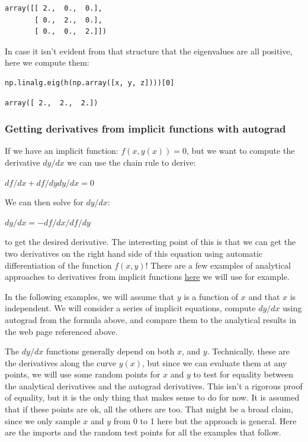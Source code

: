 \documentclass[11pt]{article}
\begin{document}
\begin{verbatim}
array([[ 2.,  0.,  0.],
       [ 0.,  2.,  0.],
       [ 0.,  0.,  2.]])
\end{verbatim}

In case it isn't evident from that structure that the eigenvalues are all positive, here we compute them:

\begin{verbatim}
np.linalg.eig(h(np.array([x, y, z])))[0]
\end{verbatim}

\begin{verbatim}
array([ 2.,  2.,  2.])
\end{verbatim}

\subsubsection{Getting derivatives from implicit functions with autograd}
\label{sec:orgdcfbef1}

If we have an implicit function: \(f(x, y(x)) = 0\), but we want to compute the derivative \(dy/dx\) we can use the chain rule to derive:

\(df/dx + df/dy dy/dx = 0\)

We can then solve for \(dy/dx\):

\(dy/dx = -df/dx / df/dy\)

to get the desired derivative. The interesting point of this is that we can get the two derivatives on the right hand side of this equation using automatic differentiation of the function \(f(x, y)\)! There are a few examples of analytical approaches to derivatives from implicit functions \href{https://www.math.ucdavis.edu/\~kouba/CalcOneDIRECTORY/implicitdiffdirectory/ImplicitDiff.html}{here} we will use for example.

In the following examples, we will assume that \(y\) is a function of \(x\) and that \(x\) is independent. We will consider a series of implicit equations, compute \(dy/dx\) using autograd from the formula above, and compare them to the analytical results in the web page referenced above.

The \(dy/dx\) functions generally depend on both \(x\), and \(y\). Technically, these are the derivatives along the curve \(y(x)\), but since we can evaluate them at any points, we will use some random points for \(x\) and \(y\) to test for equality between the analytical derivatives and the autograd derivatives. This isn't a rigorous proof of equality, but it is the only thing that makes sense to do for now. It is assumed that if these points are ok, all the others are too. That might be a broad claim, since we only sample \(x\) and \(y\) from 0 to 1 here but the approach is general. Here are the imports and the random test points for all the examples that follow.
\end{document}

